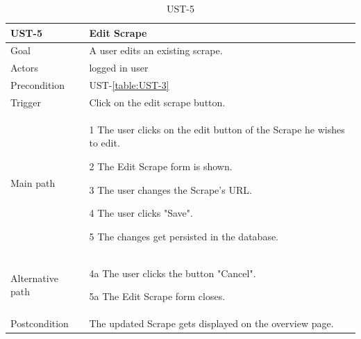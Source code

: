 \documentclass[titlepage, 12pt]{article}
\newenvironment{packed_itemize}{
  \vspace{-\topsep}
  \begin{itemize}
    \setlength{\itemsep}{1pt}
    \setlength{\parskip}{0pt}
    \setlength{\parsep}{0pt}
  }{\end{itemize}}
\begin{document}
\begin{table}[H]
  \begin{center}

    \begin{tabular}{p{4cm}|p{10cm}}
      \textbf{UST-5}   & \textbf{Edit Scrape}                                    \\
      \hline
      Goal             & A user edits an existing scrape.                        \\
      \hline
      Actors           & logged in user                                          \\
      \hline
      Precondition     & UST-\ref{table:UST-3}                                   \\
      \hline
      Trigger          & Click on the edit scrape button.                        \\
      \hline
      Main path        &
      \begin{packed_itemize}
        \item [1] The user clicks on the edit button of the Scrape he wishes to edit.
        \item [2] The Edit Scrape form is shown.
        \item [3] The user changes the Scrape's URL.
        \item [4] The user clicks "Save".
        \item [5] The changes get persisted in the database.
      \end{packed_itemize}                                                 \\
      \hline
      Alternative path &
      \begin{packed_itemize}
        \item [4a] The user clicks the button "Cancel".
        \item [5a] The Edit Scrape form closes.
      \end{packed_itemize}                                                 \\
      \hline
      Postcondition    & The updated Scrape gets displayed on the overview page. \\
    \end{tabular}

    \vspace{-2mm}
    \caption{UST-5}
    \label{table:UST-5}

  \end{center}
\end{table}
\end{document}
